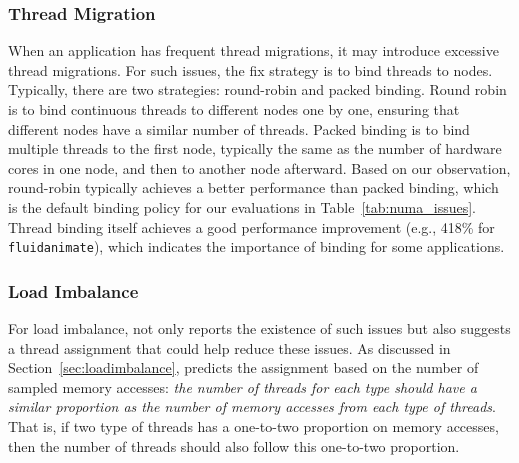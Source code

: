 \subsubsection{Thread Migration} 
When an application has frequent thread migrations, it may introduce excessive thread migrations. For such issues, the fix strategy is to bind threads to nodes. Typically, there are two strategies: round-robin and packed binding. Round robin is to bind continuous threads to different nodes one by one,  ensuring that different nodes have a similar number of threads. Packed binding is to bind multiple threads to the first node, typically the same as the number of hardware cores in one node, and then to another node afterward. Based on our observation, round-robin typically achieves a better performance than packed binding, which is the default binding policy for our evaluations in Table~\ref{tab:numa_issues}. Thread binding itself achieves a good performance improvement (e.g., 418\% for \texttt{fluidanimate}), which indicates the importance of binding for some applications. 



\subsubsection{Load Imbalance}

For load imbalance, \NP{} not only reports the existence of such issues but also suggests a thread assignment that could help reduce these issues. As discussed in Section~\ref{sec:loadimbalance}, \NP{} predicts the assignment based on the number of sampled memory accesses: \textit{the number of threads for each type should have a similar proportion as the number of memory accesses from each type of threads}. That is, if two type
of threads has a one-to-two proportion on memory accesses, then the number of threads should also follow this one-to-two proportion. 

